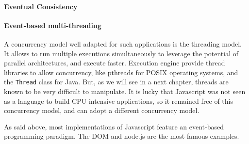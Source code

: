\paragraph{Eventual Consistency}

\paragraph{Event-based multi-threading}
















A concurrency model well adapted for such applications is the threading model.
It allows to run multiple executions simultaneously to leverage the potential of parallel architectures, and execute faster.
Execution engine provide thread libraries to allow concurrency, like pthreads for POSIX operating systems, and the \texttt{Thread} class for Java.
But, as we will see in a next chapter, threads are known to be very difficult to manipulate.
It is lucky that Javascript was not seen as a language to build CPU intensive applications, so it remained free of this concurrency model, and can adopt a different concurrency model.



















As said above, most implementations of Javascript feature an event-based programming paradigm.
The DOM and node.js are the most famous examples.

